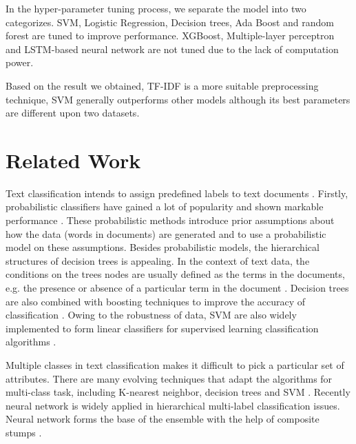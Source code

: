 \documentclass[11pt]{scrartcl}
\begin{document}
In the hyper-parameter tuning process, we separate the model into two categorizes. SVM, Logistic Regression, Decision trees, Ada Boost and random forest are tuned to improve performance. XGBoost, Multiple-layer perceptron and LSTM-based neural network are not tuned due to the lack of computation power.

Based on the result we obtained, TF-IDF is a more suitable preprocessing technique, SVM generally outperforms other models although its best parameters are different upon two datasets.


\section{Related Work}
Text classification intends to assign predefined labels to text documents \cite{allahyari2017brief,thangaraj2018text}. Firstly, probabilistic classifiers have gained a lot of popularity and shown markable performance \cite{chakrabarti1997using,joachims1996probabilistic,koller1997hierarchically,larkey1996combining}. These probabilistic methods introduce prior assumptions about how the data (words in documents) are generated and to use a probabilistic model on these assumptions. Besides probabilistic models, the hierarchical structures of decision trees is appealing. In the context of text data, the conditions on the trees nodes are usually defined as the terms in the documents, e.g. the presence or absence of a particular term in the document \cite{breiman1984classification,duda2012pattern}. Decision trees are also combined with boosting techniques to improve the accuracy of classification \cite{freund1995desicion,schapire2000boostexter}. Owing to the robustness of data, SVM are also widely implemented to form linear classifiers for supervised learning classification algorithms \cite{joachims1998text,joachims2001statistical}.

Multiple classes in text classification makes it difficult to pick a particular set of attributes. There are many evolving techniques that adapt the algorithms for multi-class task, including K-nearest neighbor, decision trees and SVM \cite{tang2016multi,yi2011multi}. Recently neural network is widely applied in hierarchical multi-label classification issues. Neural network forms the base of the ensemble with the help of composite stumps \cite{nie2015neural,cerri2014hierarchical}.
\end{document}
